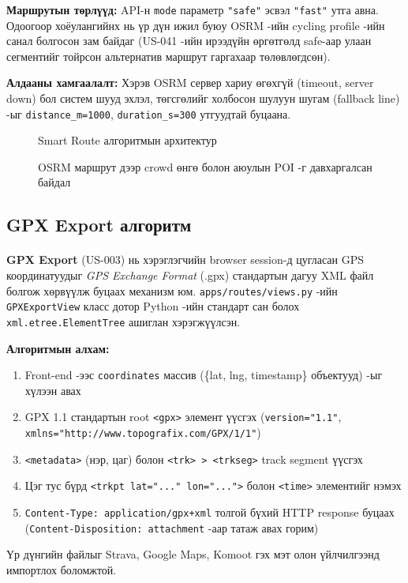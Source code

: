 \textbf{Маршрутын төрлүүд:} API-н \texttt{mode} параметр \texttt{"safe"} эсвэл \texttt{"fast"} утга авна. Одоогоор хоёулангийнх нь үр дүн ижил буюу OSRM -ийн cycling profile -ийн санал болгосон зам байдаг (US-041 -ийн ирээдүйн өргөтгөлд safe-аар улаан сегментийг тойрсон альтернатив маршрут гаргахаар төлөвлөгдсөн).

\textbf{Алдааны хамгаалалт:} Хэрэв OSRM сервер хариу өгөхгүй (timeout, server down) бол систем шууд эхлэл, төгсгөлийг холбосон шулуун шугам (fallback line) -ыг \texttt{distance\_m=1000}, \texttt{duration\_s=300} утгуудтай буцаана.

\begin{figure}[H]
    \centering
    \caption{Smart Route алгоритмын архитектур}
    \label{fig:smartRoute}
\end{figure}
\begin{figure}[H]
    \centering
    \caption{OSRM маршрут дээр crowd өнгө болон аюулын POI -г давхаргалсан байдал}
    \label{fig:route-annotation}
\end{figure}

\subsection{GPX Export алгоритм}
\paragraph{}
\textbf{GPX Export} (US-003) нь хэрэглэгчийн browser session-д цугласан GPS координатуудыг \textit{GPS Exchange Format} (.gpx) стандартын дагуу XML файл болгож хөрвүүлж буцаах механизм юм. \texttt{apps/routes/views.py} -ийн \texttt{GPXExportView} класс дотор Python -ийн стандарт сан болох \texttt{xml.etree.ElementTree} ашиглан хэрэгжүүлсэн.

\textbf{Алгоритмын алхам:}
\begin{enumerate}
    \item Front-end -ээс \texttt{coordinates} массив (\{lat, lng, timestamp\} объектууд) -ыг хүлээн авах
    \item GPX 1.1 стандартын root \texttt{<gpx>} элемент үүсгэх (\texttt{version="1.1"}, \texttt{xmlns="http://www.topografix.com/GPX/1/1"})
    \item \texttt{<metadata>} (нэр, цаг) болон \texttt{<trk> > <trkseg>} track segment үүсгэх
    \item Цэг тус бүрд \texttt{<trkpt lat="..." lon="...">} болон \texttt{<time>} элементийг нэмэх
    \item \texttt{Content-Type: application/gpx+xml} толгой бүхий HTTP response буцаах (\texttt{Content-Disposition: attachment} -аар татаж авах горим)
\end{enumerate}
Үр дүнгийн файлыг Strava, Google Maps, Komoot гэх мэт олон үйлчилгээнд импортлох боломжтой.

